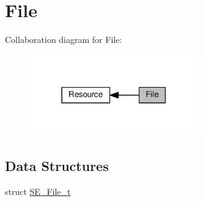 \hypertarget{group__File}{}\section{File}
\label{group__File}
Collaboration diagram for File\+:\nopagebreak
\begin{figure}[H]
\begin{center}
\leavevmode
\includegraphics[width=207pt]{group__File}
\end{center}
\end{figure}
\subsection*{Data Structures}
\begin{DoxyCompactItemize}
\item 
struct \hyperlink{structSE__File__t}{S\+E\+\_\+\+File\+\_\+t}
\end{DoxyCompactItemize}
